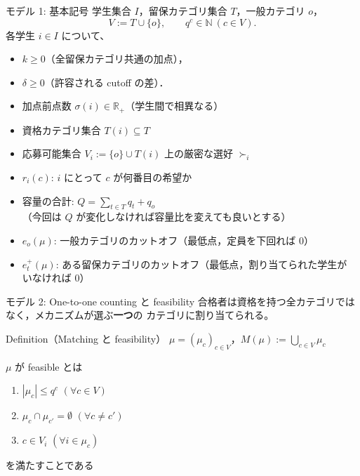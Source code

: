 \documentclass[aspectratio=43,11pt]{beamer}
\newcommand{\muc}[1]{\mu_{#1}}
\newcommand{\eo}{e_o}
\newcommand{\et}{e_t^{+}}
\newcommand{\score}{\sigma}
\begin{document}
\begin{frame}{モデル 1: 基本記号}
  学生集合 $I$，留保カテゴリ集合 $T$，一般カテゴリ $o$，
  \[
    V := T \cup \{o\}, \qquad q^c \in \mathbb{N}\ (c \in V).
  \]
  各学生 $i \in I$ について、
  \begin{itemize}\setlength{\itemsep}{2pt}
    \item $k \ge 0$（全留保カテゴリ共通の加点），
    \item $\delta \ge 0$（許容される cutoff の差）．
    \item 加点前点数 $\score(i) \in \mathbb{R}_{+}$（学生間で相異なる）
    \item 資格カテゴリ集合 $T(i) \subseteq T$
    \item 応募可能集合 $V_i := \{o\} \cup T(i)$ 上の厳密な選好 $\succ_i$
    \item $r_i(c)$: $i$ にとって $c$ が何番目の希望か
    \item {\color{red}容量の合計: $Q = \sum_{t\in T} q_t + q_o$\\
      （今回は $Q$ が変化しなければ容量比を変えても良いとする）}
    \item {\color{red}$\eo(\mu)$: 一般カテゴリのカットオフ（最低点，定員を下回れば 0）}
    \item {\color{red}$\et(\mu)$: ある留保カテゴリのカットオフ（最低点，割り当てられた学生が
      いなければ 0）}
  \end{itemize}
\end{frame}

\begin{frame}{モデル 2: One-to-one counting と feasibility}
  合格者は資格を持つ全カテゴリではなく，メカニズムが選ぶ\textbf{一つ}の
  カテゴリに割り当てられる。

  \begin{block}{Definition（Matching と feasibility）}
    $\mu = (\muc{c})_{c \in V}$，\quad $M(\mu) := \bigcup_{c \in V} \muc{c}$

    $\mu$ が feasible とは
    \begin{enumerate}
      \item[(i)] $|\muc{c}| \le q^c$ \quad $(\forall c \in V)$
      \item[(ii)] $\muc{c} \cap \muc{c'} = \emptyset$ \quad $(\forall c \ne c')$
      \item[(iii)] $c \in V_i$ \quad $(\forall i \in \muc{c})$
    \end{enumerate}
    を満たすことである
  \end{block}
\end{frame}
\end{document}
